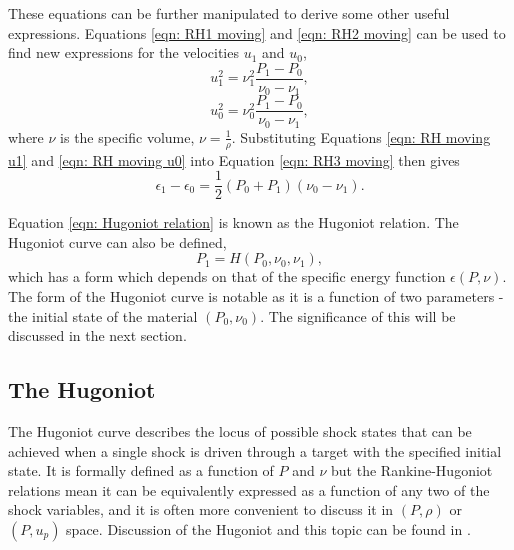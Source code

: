 These equations can be further manipulated to derive some other useful expressions. Equations \ref{eqn: RH1 moving} and \ref{eqn: RH2 moving} can be used to find new expressions for the velocities $u_1$ and $u_0$, 
\begin{equation} u_1^2 = \nu_1^2 \frac{P_1 - P_0}{\nu_0 - \nu_1}, \label{eqn: RH moving u1} \end{equation}
\begin{equation} u_0^2 = \nu_0^2 \frac{P_1 - P_0}{\nu_0 - \nu_1}, \label{eqn: RH moving u0} \end{equation}
where $\nu$ is the specific volume, $\nu = \frac{1}{\rho}$. Substituting Equations \ref{eqn: RH moving u1} and \ref{eqn: RH moving u0} into Equation \ref{eqn: RH3 moving} then gives
\begin{equation} \epsilon_1 - \epsilon_0 = \frac{1}{2}(P_0 + P_1)(\nu_0 - \nu_1).\label{eqn: Hugoniot relation} \end{equation}

Equation \ref{eqn: Hugoniot relation} is known as the Hugoniot relation. The Hugoniot curve can also be defined, 
\begin{equation} P_1 = H(P_0, \nu_0, \nu_1),\label{eqn: Hugoniot relation} \end{equation}
which has a form which depends on that of the specific energy function $\epsilon(P, \nu)$. The form of the Hugoniot curve is notable as it is a function of two parameters - the initial state of the material $(P_0, \nu_0)$. The significance of this will be discussed in the next section.

\subsection{The Hugoniot} \label{The Hugoniot theory}

The Hugoniot curve describes the locus of possible shock states that can be achieved when a single shock is driven through a target with the specified initial state. It is formally defined as a function of $P$ and $\nu$ but the Rankine-Hugoniot relations mean it can be equivalently expressed as a function of any two of the shock variables, and it is often more convenient to discuss it in $(P, \rho)$ or $(P, u_p)$ space. Discussion of the Hugoniot and this topic can be found in \cite{Forbes2012}.


